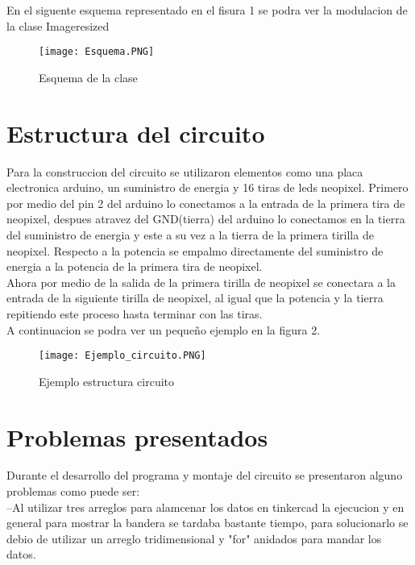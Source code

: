 \documentclass{article}
\begin{document}
En el siguente esquema representado en el fisura 1 se podra ver la modulacion de la clase Imageresized

\begin{figure}[h]
\texttt{[image: Esquema.PNG]}
\centering
\caption{Esquema de la clase}
\label{fig:Esquema}
\end{figure}

\section{Estructura del circuito}\label{contenido}

Para la construccion del circuito se utilizaron elementos como una placa electronica arduino, un suministro de energia y 16 tiras de leds neopixel. Primero por medio del pin 2 del arduino lo conectamos a la entrada de la primera tira de neopixel, despues atravez del GND(tierra) del arduino lo conectamos en la tierra del suministro de energia y este a su vez a la tierra de la primera tirilla de neopixel. Respecto a la potencia se empalmo directamente del suministro de energia a la potencia de la primera tira de neopixel.\\

Ahora por medio de la salida de la primera tirilla de neopixel se conectara a la entrada de la siguiente tirilla de neopixel, al igual que la potencia y la tierra repitiendo este proceso hasta terminar con las tiras.\\

A continuacion se podra ver un pequeño ejemplo en la figura 2.\\


\begin{figure}[h]
\texttt{[image: Ejemplo\_circuito.PNG]}
\centering
\caption{Ejemplo estructura circuito}
\label{fig:Ejemplo_circuito}
\end{figure}


\section{Problemas presentados}\label{contenido}

Durante el desarrollo del programa y montaje del circuito se presentaron alguno problemas como puede ser:\\

--Al utilizar tres arreglos para alamcenar los datos en tinkercad la ejecucion y en general para mostrar la bandera se tardaba bastante tiempo, para solucionarlo se debio de utilizar un arreglo tridimensional y "for" anidados para mandar los datos.\\
\end{document}
